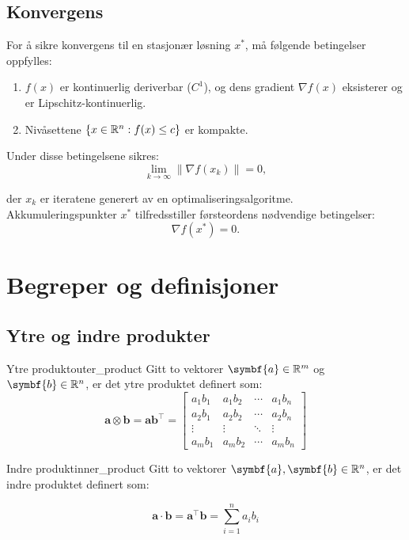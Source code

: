 \documentclass[10pt, a4paper]{article}
\begin{document}
\subsection*{Konvergens}
For å sikre konvergens til en stasjonær løsning \( x^* \), må følgende betingelser oppfylles:
\begin{enumerate}
  \item \( f(x) \) er kontinuerlig deriverbar (\( C^1 \)), og dens gradient \( \nabla f(x) \) eksisterer og er Lipschitz-kontinuerlig.
  \item Nivåsettene \( \{x \in \mathbb{R}^n : f(x) \leq c\} \) er kompakte.
\end{enumerate}

Under disse betingelsene sikres:
\[
  \lim_{k \to \infty} \|\nabla f(x_k)\| = 0,
\]

der \( x_k \) er iteratene generert av en optimaliseringsalgoritme. Akkumuleringspunkter \( x^* \) tilfredsstiller førsteordens nødvendige betingelser:
\[
  \nabla f(x^*) = 0.
\]

\section{Begreper og definisjoner}
\subsection{Ytre og indre produkter}
\begin{definition}{Ytre produkt}{outer_product}
  Gitt to vektorer \( \symbf{a} \in \R^m \) og \( \symbf{b} \in \R^n \), er det ytre produktet definert som:
  \[
    \symbf{a} \otimes \symbf{b} = \symbf{a} \symbf{b}^\top =
    \begin{bmatrix}
      a_1b_1 & a_1b_2 & \cdots & a_1b_n \\
      a_2b_1 & a_2b_2 & \cdots & a_2b_n \\
      \vdots  & \vdots  & \ddots & \vdots  \\
      a_mb_1 & a_mb_2 & \cdots & a_mb_n
    \end{bmatrix}
  \]
\end{definition}

\begin{definition}{Indre produkt}{inner_product}
  Gitt to vektorer \( \symbf{a}, \symbf{b} \in \R^n \), er det indre produktet definert som:
  
  \[
    \symbf{a} \cdot \symbf{b} = \symbf{a}^\top \symbf{b} = \sum_{i=1}^{n} a_i b_i
  \]

\end{definition}
\end{document}
